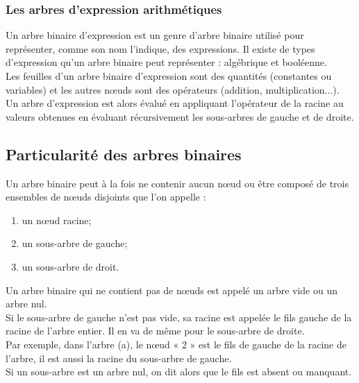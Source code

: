 \documentclass{report}
\begin{document}
\subsubsection{Les arbres d'expression arithmétiques}

Un arbre binaire d'expression est un genre d'arbre binaire utilisé pour représenter, comme son nom l'indique, des expressions. Il existe de types d'expression qu'un arbre binaire peut représenter : algébrique et booléenne.  \\ 
Les feuilles d'un arbre binaire d'expression sont des quantités (constantes ou variables) et les autres nœuds sont des opérateurs (addition, multiplication...).\\
Un arbre d'expression est alors évalué en appliquant l'opérateur de la racine au valeurs obtenues en évaluant récursivement les sous-arbres de gauche et de droite.


  
\subsection{Particularité des arbres binaires}

Un arbre binaire peut à la fois ne contenir aucun nœud ou être composé de trois ensembles de nœuds disjoints que l'on appelle :
\begin{enumerate}
\item un nœud racine;
\item un sous-arbre de gauche;
\item un sous-arbre de droit.
\end{enumerate}

Un arbre binaire qui ne contient pas de nœuds est appelé un arbre vide ou un arbre nul.\\
Si le sous-arbre de gauche n'est pas vide, sa racine est appelée le fils gauche de la racine de l'arbre entier. Il en va de même pour le sous-arbre de droite.\\
Par exemple, dans l'arbre (a), le nœud « 2 » est le fils de gauche de la racine de l'arbre, il est aussi la racine du sous-arbre de gauche.\\
Si un sous-arbre est un arbre nul, on dit alors que le fils est absent ou manquant.\\

\end{document}
